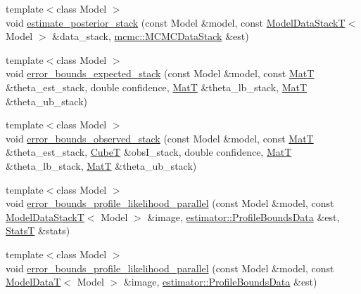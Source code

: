 \begin{DoxyCompactItemize}
\item 
{\footnotesize template$<$class Model $>$ }\\void \hyperlink{namespacemappel_1_1methods_1_1openmp_a86a4ec8918ed62a8f0665a6fc1885ab9}{estimate\+\_\+posterior\+\_\+stack} (const Model \&model, const \hyperlink{namespacemappel_aaeb6665bc57476dd93c2df6ad8bc4768}{Model\+Data\+StackT}$<$ Model $>$ \&data\+\_\+stack, \hyperlink{structmappel_1_1mcmc_1_1MCMCDataStack}{mcmc\+::\+M\+C\+M\+C\+Data\+Stack} \&est)
\item 
{\footnotesize template$<$class Model $>$ }\\void \hyperlink{namespacemappel_1_1methods_1_1openmp_ac9aac4b2df768e850bee73aa5c7f2686}{error\+\_\+bounds\+\_\+expected\+\_\+stack} (const Model \&model, const \hyperlink{namespacemappel_a7091ab87c528041f7e2027195fad8915}{MatT} \&theta\+\_\+est\+\_\+stack, double confidence, \hyperlink{namespacemappel_a7091ab87c528041f7e2027195fad8915}{MatT} \&theta\+\_\+lb\+\_\+stack, \hyperlink{namespacemappel_a7091ab87c528041f7e2027195fad8915}{MatT} \&theta\+\_\+ub\+\_\+stack)
\item 
{\footnotesize template$<$class Model $>$ }\\void \hyperlink{namespacemappel_1_1methods_1_1openmp_a82a1f1d04ea0a21f003b35fad25a3442}{error\+\_\+bounds\+\_\+observed\+\_\+stack} (const Model \&model, const \hyperlink{namespacemappel_a7091ab87c528041f7e2027195fad8915}{MatT} \&theta\+\_\+est\+\_\+stack, \hyperlink{namespacemappel_ab2afab4e6c8805e83946670d882768c2}{CubeT} \&obs\+I\+\_\+stack, double confidence, \hyperlink{namespacemappel_a7091ab87c528041f7e2027195fad8915}{MatT} \&theta\+\_\+lb\+\_\+stack, \hyperlink{namespacemappel_a7091ab87c528041f7e2027195fad8915}{MatT} \&theta\+\_\+ub\+\_\+stack)
\item 
{\footnotesize template$<$class Model $>$ }\\void \hyperlink{namespacemappel_1_1methods_1_1openmp_ad79d4ade28ab7a6369e7215a6e317692}{error\+\_\+bounds\+\_\+profile\+\_\+likelihood\+\_\+parallel} (const Model \&model, const \hyperlink{namespacemappel_aaeb6665bc57476dd93c2df6ad8bc4768}{Model\+Data\+StackT}$<$ Model $>$ \&image, \hyperlink{structmappel_1_1estimator_1_1ProfileBoundsData}{estimator\+::\+Profile\+Bounds\+Data} \&est, \hyperlink{namespacemappel_a04ab395b0cf82c4ce68a36b2212649a5}{StatsT} \&stats)
\item 
{\footnotesize template$<$class Model $>$ }\\void \hyperlink{namespacemappel_1_1methods_1_1openmp_a0fc866281e3dbe1810951b048485be95}{error\+\_\+bounds\+\_\+profile\+\_\+likelihood\+\_\+parallel} (const Model \&model, const \hyperlink{namespacemappel_a97f050df953605381ae9c901c3b125f1}{Model\+DataT}$<$ Model $>$ \&image, \hyperlink{structmappel_1_1estimator_1_1ProfileBoundsData}{estimator\+::\+Profile\+Bounds\+Data} \&est)

\end{DoxyCompactItemize}
